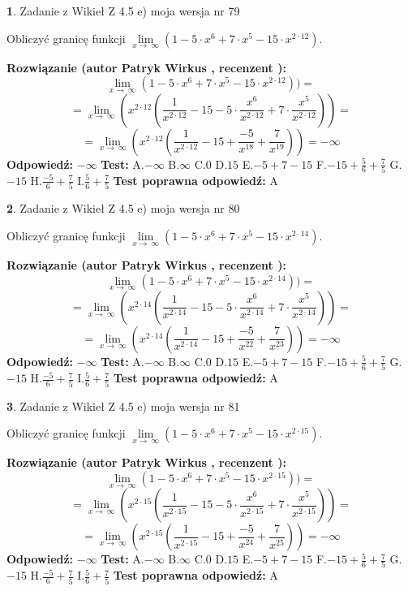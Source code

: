 \documentclass[12pt, a4paper]{article}
\theoremstyle{definition} %
\newtheorem{zad}{}
\newcommand{\zadStart}[1]{\begin{zad}#1\newline}
\newcommand{\zadStop}{\end{zad}}
\newcommand{\rozwStart}[2]{\noindent \textbf{Rozwiązanie (autor #1 , recenzent #2): }\newline}
\newcommand{\rozwStop}{\newline}
\newcommand{\odpStart}{\noindent \textbf{Odpowiedź:}\newline}
\newcommand{\odpStop}{\newline}
\newcommand{\testStart}{\noindent \textbf{Test:}\newline}
\newcommand{\testStop}{\newline}
\newcommand{\kluczStart}{\noindent \textbf{Test poprawna odpowiedź:}\newline}
\newcommand{\kluczStop}{\newline}
\begin{document}
\zadStart{Zadanie z Wikieł Z 4.5 e) moja wersja nr 79}



Obliczyć granicę funkcji  $\lim\limits_{x\to\ \infty}(1 - 5 \cdot x^{6}+7 \cdot x^{5}- 15 \cdot x^{2\cdot12})$.
\zadStop
\rozwStart{Patryk Wirkus}{}
$$\lim\limits_{x\to\ \infty}(1 - 5 \cdot x^{6}+7 \cdot x^{5}- 15 \cdot x^{2\cdot12}))=$$
$$=\lim\limits_{x\to\ \infty}(x^{2\cdot12}(\frac{1}{x^{2\cdot12}}-15 -5 \cdot \frac{x^{6}}{x^{2\cdot12}}+7 \cdot \frac{x^{5}}{x^{2\cdot12}}))=$$
$$=\lim\limits_{x\to\ \infty}(x^{2\cdot12}(\frac{1}{x^{2\cdot12}}-15 + \frac{-5}{x^{18}}+ \frac{7}{x^{19}}))=-\infty$$
\rozwStop
\odpStart
$-\infty$
\odpStop
\testStart
A.$-\infty$ B.$\infty$ C.$0$ D.$15$ E.$-5 + 7 - 15$
F.$-15+\frac{5}{6}+\frac{7}{5}$ G.$-15$
H.$\frac{-5}{6}+\frac{7}{5}$
I.$\frac{5}{6}+\frac{7}{5}$
\testStop
\kluczStart
A
\kluczStop



\zadStart{Zadanie z Wikieł Z 4.5 e) moja wersja nr 80}



Obliczyć granicę funkcji  $\lim\limits_{x\to\ \infty}(1 - 5 \cdot x^{6}+7 \cdot x^{5}- 15 \cdot x^{2\cdot14})$.
\zadStop
\rozwStart{Patryk Wirkus}{}
$$\lim\limits_{x\to\ \infty}(1 - 5 \cdot x^{6}+7 \cdot x^{5}- 15 \cdot x^{2\cdot14}))=$$
$$=\lim\limits_{x\to\ \infty}(x^{2\cdot14}(\frac{1}{x^{2\cdot14}}-15 -5 \cdot \frac{x^{6}}{x^{2\cdot14}}+7 \cdot \frac{x^{5}}{x^{2\cdot14}}))=$$
$$=\lim\limits_{x\to\ \infty}(x^{2\cdot14}(\frac{1}{x^{2\cdot14}}-15 + \frac{-5}{x^{22}}+ \frac{7}{x^{23}}))=-\infty$$
\rozwStop
\odpStart
$-\infty$
\odpStop
\testStart
A.$-\infty$ B.$\infty$ C.$0$ D.$15$ E.$-5 + 7 - 15$
F.$-15+\frac{5}{6}+\frac{7}{5}$ G.$-15$
H.$\frac{-5}{6}+\frac{7}{5}$
I.$\frac{5}{6}+\frac{7}{5}$
\testStop
\kluczStart
A
\kluczStop



\zadStart{Zadanie z Wikieł Z 4.5 e) moja wersja nr 81}



Obliczyć granicę funkcji  $\lim\limits_{x\to\ \infty}(1 - 5 \cdot x^{6}+7 \cdot x^{5}- 15 \cdot x^{2\cdot15})$.
\zadStop
\rozwStart{Patryk Wirkus}{}
$$\lim\limits_{x\to\ \infty}(1 - 5 \cdot x^{6}+7 \cdot x^{5}- 15 \cdot x^{2\cdot15}))=$$
$$=\lim\limits_{x\to\ \infty}(x^{2\cdot15}(\frac{1}{x^{2\cdot15}}-15 -5 \cdot \frac{x^{6}}{x^{2\cdot15}}+7 \cdot \frac{x^{5}}{x^{2\cdot15}}))=$$
$$=\lim\limits_{x\to\ \infty}(x^{2\cdot15}(\frac{1}{x^{2\cdot15}}-15 + \frac{-5}{x^{24}}+ \frac{7}{x^{25}}))=-\infty$$
\rozwStop
\odpStart
$-\infty$
\odpStop
\testStart
A.$-\infty$ B.$\infty$ C.$0$ D.$15$ E.$-5 + 7 - 15$
F.$-15+\frac{5}{6}+\frac{7}{5}$ G.$-15$
H.$\frac{-5}{6}+\frac{7}{5}$
I.$\frac{5}{6}+\frac{7}{5}$
\testStop
\kluczStart
A
\kluczStop
\end{document}
